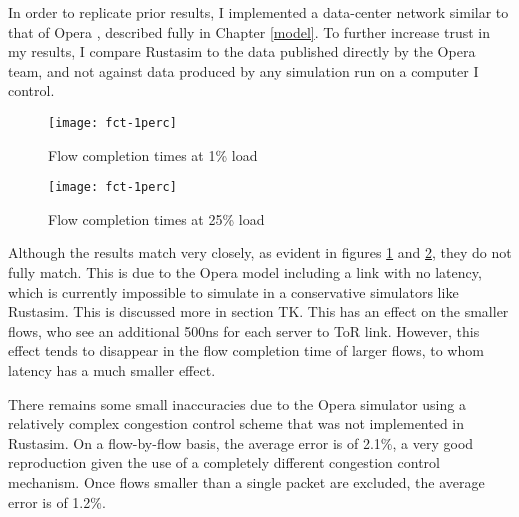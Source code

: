 In order to replicate prior results, I implemented a data-center network similar to that of Opera \opera, described fully in Chapter \ref{model}.
To further increase trust in my results, I compare Rustasim to the data published directly by the Opera team, and not against data produced by any simulation run on a computer I control.

\begin{figure}[h]
    \centering
    \texttt{[image: fct-1perc]}
    \caption{
        Flow completion times at 1\% load
    }
    \label{fct-1perc}
\end{figure}

\begin{figure}[h]
    \centering
    \texttt{[image: fct-1perc]}
    \caption{
        Flow completion times at 25\% load
    }
    \label{fct-25perc}
\end{figure}

Although the results match very closely, as evident in figures \ref{fct-1perc} and \ref{fct-25perc}, they do not fully match.
This is due to the Opera model including a link with no latency, which is currently impossible to simulate in a conservative simulators like Rustasim.
This is discussed more in section TK. %
This has an effect on the smaller flows, who see an additional 500ns for each server to ToR link.
However, this effect tends to disappear in the flow completion time of larger flows, to whom latency has a much smaller effect.

There remains some small inaccuracies due to the Opera simulator using a relatively complex congestion control scheme that was not implemented in Rustasim.
On a flow-by-flow basis, the average error is of 2.1\%, a very good reproduction given the use of a completely different congestion control mechanism.
Once flows smaller than a single packet are excluded, the average error is of 1.2\%.


